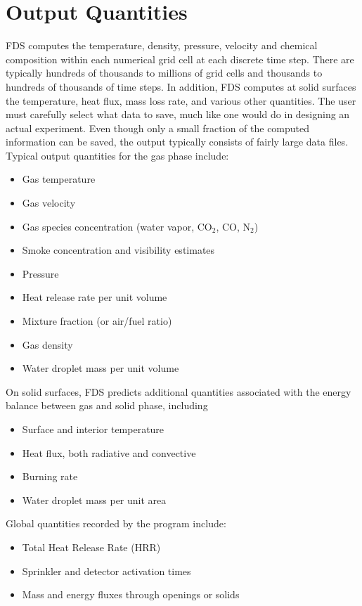 \documentclass[11pt]{book}
\begin{document}
\section{Output Quantities}

FDS computes the temperature, density, pressure, velocity and chemical composition within each numerical grid cell at each discrete time step. There
are typically hundreds of thousands to millions of grid cells and thousands to hundreds of thousands of time steps. In addition, FDS computes at
solid surfaces the temperature, heat flux, mass loss rate, and various other quantities. The user must carefully select what data to save, much like
one would do in designing an actual experiment. Even though only a small fraction of the computed information can be saved, the output typically
consists of fairly large data files. Typical output quantities for the gas phase include:
\begin{itemize}
\setlength{\itemsep}{0.0in}
\item Gas temperature
\item Gas velocity
\item Gas species concentration (water vapor, CO$_2$, CO, N$_2$)
\item Smoke concentration and visibility estimates
\item Pressure
\item Heat release rate per unit volume
\item Mixture fraction (or air/fuel ratio)
\item Gas density
\item Water droplet mass per unit volume
\end{itemize}
On solid surfaces, FDS predicts additional quantities associated with the energy balance between gas and solid phase, including
\begin{itemize}
\setlength{\itemsep}{0.0in}
\item Surface and interior temperature
\item Heat flux, both radiative and convective
\item Burning rate
\item Water droplet mass per unit area
\end{itemize}
Global quantities recorded by the program include:
\begin{itemize}
\setlength{\itemsep}{0.0in}
\item Total Heat Release Rate (HRR)
\item Sprinkler and detector activation times
\item Mass and energy fluxes through openings or solids
\end{itemize}
\end{document}
